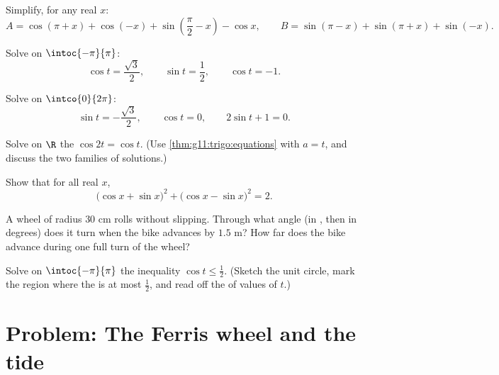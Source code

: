 \begin{exercise}[$\star\star$]\label{exo:g11:trigo:5}
Simplify, for any real $x$:
\[
A = \cos(\pi + x) + \cos(-x) + \sin\left(\frac\pi2 - x\right) - \cos x,
\qquad
B = \sin(\pi - x) + \sin(\pi + x) + \sin(-x) .
\]
\end{exercise}

\begin{exercise}[$\star\star$]\label{exo:g11:trigo:6}
Solve on $\intoc{-\pi}{\pi}$:
\[
\cos t = \frac{\sqrt3}{2}, \qquad
\sin t = \frac12, \qquad
\cos t = -1 .
\]
\end{exercise}

\begin{exercise}[$\star\star$]\label{exo:g11:trigo:7}
Solve on $\intco{0}{2\pi}$:
\[
\sin t = -\frac{\sqrt3}{2}, \qquad
\cos t = 0, \qquad
2\sin t + 1 = 0 .
\]
\end{exercise}

\begin{exercise}[$\star\star$]\label{exo:g11:trigo:8}
Solve on $\R$ the  $\cos 2t = \cos t$. (Use
\cref{thm:g11:trigo:equations} with $a = t$, and discuss the two families
of solutions.)
\end{exercise}

\begin{exercise}[$\star\star$]\label{exo:g11:trigo:9}
Show that for all real $x$,
\[
\bigl(\cos x + \sin x\bigr)^2 + \bigl(\cos x - \sin x\bigr)^2 = 2 .
\]
\end{exercise}

\begin{exercise}[$\star\star$]\label{exo:g11:trigo:10}
A wheel of radius $30$ cm rolls without slipping. Through what angle (in
, then in degrees) does it turn when the bike advances by $1.5$ m?
How far does the bike advance during one full turn of the wheel?
\end{exercise}

\begin{exercise}[$\star\star\star$]\label{exo:g11:trigo:11}
Solve on $\intoc{-\pi}{\pi}$ the inequality
$\cos t \leq \frac12$. (Sketch the unit circle, mark the region where the
 is at most $\frac12$, and read off the  of values of
$t$.)
\end{exercise}

\section{Problem: The Ferris wheel and the tide}

